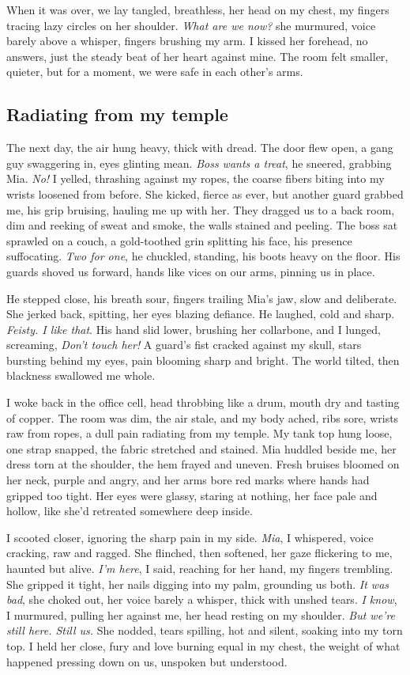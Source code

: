 \documentclass[12pt,oneside]{book}
\begin{document}
When it was over, we lay tangled, breathless, her head on my chest, my fingers tracing lazy circles on her shoulder. \textit{What are we now?} she murmured, voice barely above a whisper, fingers brushing my arm. I kissed her forehead, no answers, just the steady beat of her heart against mine. The room felt smaller, quieter, but for a moment, we were safe in each other’s arms.

\subsection*{Radiating from my temple}

The next day, the air hung heavy, thick with dread. The door flew open, a gang guy swaggering in, eyes glinting mean. \textit{Boss wants a treat}, he sneered, grabbing Mia. \textit{No!} I yelled, thrashing against my ropes, the coarse fibers biting into my wrists loosened from before. She kicked, fierce as ever, but another guard grabbed me, his grip bruising, hauling me up with her. They dragged us to a back room, dim and reeking of sweat and smoke, the walls stained and peeling. The boss sat sprawled on a couch, a gold-toothed grin splitting his face, his presence suffocating. \textit{Two for one}, he chuckled, standing, his boots heavy on the floor. His guards shoved us forward, hands like vices on our arms, pinning us in place.

He stepped close, his breath sour, fingers trailing Mia’s jaw, slow and deliberate. She jerked back, spitting, her eyes blazing defiance. He laughed, cold and sharp. \textit{Feisty. I like that}. His hand slid lower, brushing her collarbone, and I lunged, screaming, \textit{Don’t touch her!} A guard’s fist cracked against my skull, stars bursting behind my eyes, pain blooming sharp and bright. The world tilted, then blackness swallowed me whole.

I woke back in the office cell, head throbbing like a drum, mouth dry and tasting of copper. The room was dim, the air stale, and my body ached, ribs sore, wrists raw from ropes, a dull pain radiating from my temple. My tank top hung loose, one strap snapped, the fabric stretched and stained. Mia huddled beside me, her dress torn at the shoulder, the hem frayed and uneven. Fresh bruises bloomed on her neck, purple and angry, and her arms bore red marks where hands had gripped too tight. Her eyes were glassy, staring at nothing, her face pale and hollow, like she’d retreated somewhere deep inside.

I scooted closer, ignoring the sharp pain in my side. \textit{Mia}, I whispered, voice cracking, raw and ragged. She flinched, then softened, her gaze flickering to me, haunted but alive. \textit{I’m here}, I said, reaching for her hand, my fingers trembling. She gripped it tight, her nails digging into my palm, grounding us both. \textit{It was bad}, she choked out, her voice barely a whisper, thick with unshed tears. \textit{I know}, I murmured, pulling her against me, her head resting on my shoulder. \textit{But we’re still here. Still us.} She nodded, tears spilling, hot and silent, soaking into my torn top. I held her close, fury and love burning equal in my chest, the weight of what happened pressing down on us, unspoken but understood.
\end{document}
